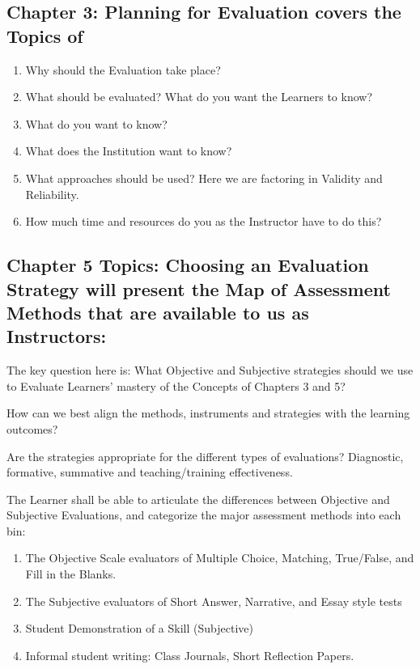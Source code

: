 \subsection {Chapter 3: Planning for Evaluation covers the Topics of }

\begin{enumerate}
	\item Why should the Evaluation take place?
	\item What should be evaluated? What do you want the Learners to know?
	\item What do you want to know?
	\item What does the Institution want to know?
	\item What approaches should be used? Here we are factoring in Validity and Reliability.
	\item How much time and resources do you as the Instructor have to do this?
\end{enumerate}

\subsection{Chapter 5 Topics: Choosing an Evaluation Strategy will present the Map of Assessment Methods that are available to us as Instructors:}
The key question here is: What Objective and Subjective strategies should we use to Evaluate Learners' mastery of the Concepts of Chapters 3 and 5? 

How can we best align the methods, instruments and strategies with the learning outcomes?

Are the strategies appropriate for the different types of evaluations? Diagnostic, formative, summative and teaching/training effectiveness.

The Learner shall be able to articulate the differences between Objective and Subjective Evaluations, and categorize the major assessment methods into each bin:
\begin{enumerate}
	\item The Objective Scale evaluators of Multiple Choice, Matching, True/False, and Fill in the Blanks.
    \item The Subjective evaluators of Short Answer, Narrative, and Essay style tests
    \item Student Demonstration of a Skill (Subjective)
    \item Informal student writing: Class Journals, Short Reflection Papers.
\end{enumerate}

